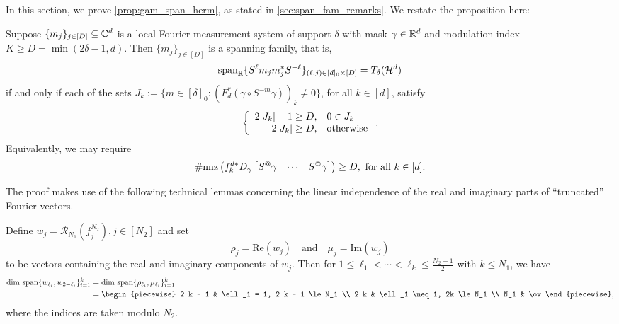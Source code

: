 In this section, we prove \cref{prop:gam_span_herm}, as stated in \cref{sec:span_fam_remarks}.  We restate the proposition here:

\begin{proposition*}
  Suppose $\{m_j\}_{j \in [D]} \subseteq \mathbb{C}^d$ is a local Fourier measurement system of support $\delta$ with mask $\gamma \in \mathbb{R}^d$ and modulation index $K \ge D = \min (2 \delta - 1, d)$.  Then $\{m_j\}_{j \in [D]}$ is a spanning family, that is, \[\operatorname{span}_{\mathbb{R}}\{S^{\ell} m_j m_j^* S^{-\ell}\}_{(\ell, j) \in [d]_0 \times [D]} = T_\delta(\mathcal{H}^d)\] if and only if each of the sets $J_k := \{m \in [\delta]_0 : (F_d^* (\gamma \circ S^{-m} \gamma))_k \neq 0\}$, for all $k \in [d]$, satisfy \[ \left\{\begin{array}{r@{,\quad}l} 2 |J_k| - 1 \ge D & 0 \in J_k \\ 2 |J_k| \ge D & \text{otherwise}\end{array}\right..\]  Equivalently, we may require \[ \#\mathrm{nnz}\left(f_k^{d*} D_\gamma \rowmatfun{S^@ \gamma}{1 - \delta}{\delta - 1}\right) \ge D, \ \text{for all} \ k \in [d].\]
\end{proposition*}

The proof makes use of the following technical lemmas concerning the linear independence of the real and imaginary parts of ``truncated'' Fourier vectors.

\begin{lemma}
  Define $w_j = \mathcal{R}_{N_1}(f_j^{N_2}), j \in [N_2]$ and set \[\rho_j = \mathrm{Re}(w_j) \quad\text{and}\quad \mu_j = \mathrm{Im}(w_j)\] to be vectors containing the real and imaginary components of $w_j$.  Then for $1 \le \ell_1 < \cdots < \ell_k \le \frac{N_2 + 1}{2}$ with $k \le N_1$, we have \begin{align*} \dim\,\Span\{w_{\ell_i}, w_{2 - \ell_i}\}_{i = 1}^k &= \dim\,\Span\{\rho_{\ell_i}, \mu_{\ell_i}\}_{i = 1}^k \\ &= \begin{piecewise} 2 k - 1 & \ell_1 = 1, 2 k - 1 \le N_1 \\ 2 k & \ell_1 \neq 1, 2k \le N_1 \\ N_1 & \ow \end{piecewise}%
    ,\end{align*} where the indices are taken modulo $N_2$. \label{lem:conjugate_span_dim}
\end{lemma}

